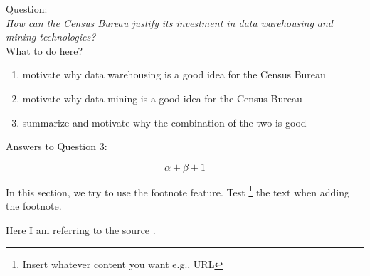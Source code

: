 Question:\\
\emph{
    How can the Census Bureau justify its investment in data warehousing and mining
technologies?
}\\

What to do here?
\begin{enumerate}
    \item motivate why data warehousing is a good idea for the Census Bureau
    \item motivate why data mining is a good idea for the Census Bureau
    \item summarize and motivate why the combination of the two is good 
  \end{enumerate}

Answers to Question 3:

\begin{equation}
\alpha + \beta + 1
\end{equation}

In this section, we try to use the footnote feature. Test \footnote{Insert whatever content you want e.g., URL} the text when adding the footnote.

Here I am referring to the source \cite{DataScience}.